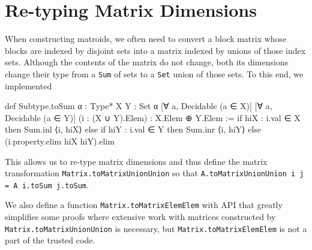 \section{Re-typing Matrix Dimensions}

When constructing matroids, we often need to convert a block matrix whose blocks are indexed by disjoint sets into a matrix indexed by unions of those index sets. Although the contents of the matrix do not change, both its dimensions change their type from a \texttt{Sum} of sets to a \texttt{Set} union of those sets. To this end, we implemented
\begin{leancode}
def Subtype.toSum {α : Type*} {X Y : Set α}
    [∀ a, Decidable (a ∈ X)]
    [∀ a, Decidable (a ∈ Y)]
    (i : (X ∪ Y).Elem) :
    X.Elem ⊕ Y.Elem :=
  if hiX : i.val ∈ X then Sum.inl ⟨i, hiX⟩ else
  if hiY : i.val ∈ Y then Sum.inr ⟨i, hiY⟩ else
  (i.property.elim hiX hiY).elim
\end{leancode}
This allows us to re-type matrix dimensions and thus define the matrix transformation \texttt{Matrix.toMatrixUnionUnion} so that \texttt{A.toMatrixUnionUnion i j = A i.toSum j.toSum}.

We also define a function \texttt{Matrix.toMatrixElemElem} with API that greatly simplifies some proofs where extensive work with matrices constructed by \texttt{Matrix.toMatrixUnionUnion} is necessary, but \texttt{Matrix.toMatrixElemElem} is not a part of the trusted code.
